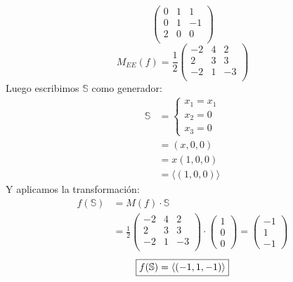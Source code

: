 \documentclass[../practica.root.tex]{subfiles}
\begin{document}
\begin{enumerate}
\[\begin{pmatrix}
                  0 & 1 & 1  \\
                  0 & 1 & -1 \\
                  2 & 0 & 0  \\
              \end{pmatrix}
          \] \[
              M_{EE}(f)  =
              \frac{1}{2}
              \begin{pmatrix}
                  -2 & 4 & 2  \\
                  2  & 3 & 3  \\
                  -2 & 1 & -3 \\
              \end{pmatrix}
          \]
          Luego escribimos $\mathbb{S}$ como generador:
          \begin{align*}
              \mathbb{S} & =\begin{cases}
                  x_1=x_1 \\
                  x_2=0   \\
                  x_3=0
              \end{cases} \\
                         & =(x, 0, 0)                  \\
                         & =x(1, 0, 0)                 \\
                         & =\langle(1, 0, 0)\rangle
          \end{align*}
          Y aplicamos la transformación:
          \begin{align*}
              f(\mathbb{S}) & =M(f)\cdot\mathbb{S}                                                                               \\
                            & =\frac{1}{2}\begin{pmatrix}
                  -2 & 4 & 2  \\
                  2  & 3 & 3  \\
                  -2 & 1 & -3 \\
              \end{pmatrix}\cdot\begin{pmatrix}
                  1 \\
                  0 \\
                  0
              \end{pmatrix} = \begin{pmatrix}
                  -1 \\
                  1 \\
                  -1
              \end{pmatrix}
          \end{align*}
          \[ \boxed{f(\S) = \langle(-1,1,-1)\rangle} \]



\end{enumerate}
\end{document}
